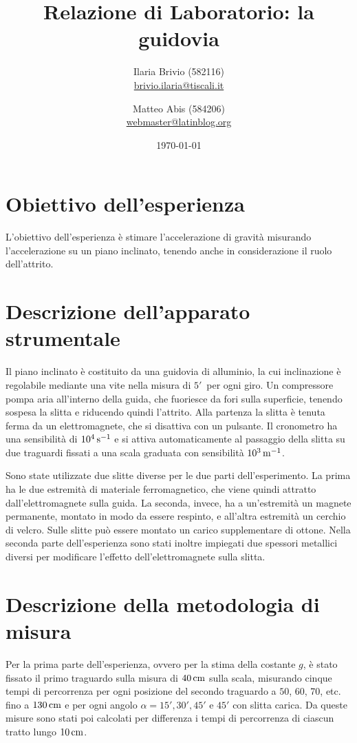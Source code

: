 \documentclass[italian,a4paper]{article}
\begin{document}
\title{Relazione di Laboratorio: la guidovia}
\author{\normalsize Ilaria Brivio (582116)\\%
\normalsize \url{brivio.ilaria@tiscali.it}%
\and %
\normalsize Matteo Abis (584206)\\ %
\normalsize \url{webmaster@latinblog.org}}
\date{\today}
\maketitle
\section{Obiettivo dell'esperienza}
L'obiettivo dell'esperienza è stimare l'accelerazione di gravità misurando l'accelerazione su un piano inclinato, tenendo anche in considerazione il ruolo dell'attrito.
\section{Descrizione dell'apparato strumentale}
Il piano inclinato è costituito da una guidovia di alluminio, la cui inclinazione è regolabile mediante una vite nella misura di $5'$~per ogni giro. Un compressore pompa aria all'interno della guida, che fuoriesce da fori sulla superficie, tenendo sospesa la slitta e riducendo quindi l'attrito. Alla partenza la slitta è tenuta ferma da un elettromagnete, che si disattiva con un pulsante. Il cronometro ha una sensibilità di $\unit[10^4]{s^{-1}}$ e si attiva automaticamente al passaggio della slitta su due traguardi fissati a una scala graduata con sensibilità $\unit[10^3]{m^{-1}}$.

Sono state utilizzate due slitte diverse per le due parti dell'esperimento. La prima ha le due estremità di materiale ferromagnetico, che viene quindi attratto dall'elettromagnete sulla guida. La seconda, invece, ha a un'estremità un magnete permanente, montato in modo da essere respinto, e all'altra estremità un cerchio di velcro. Sulle slitte può essere montato un carico supplementare di ottone. Nella seconda parte dell'esperienza sono stati inoltre impiegati due spessori metallici diversi per modificare l'effetto dell'elettromagnete sulla slitta.
\section{Descrizione della metodologia di misura}
Per la prima parte dell'esperienza, ovvero per la stima della costante $g$, è stato fissato il primo traguardo sulla misura di $\unit[40]{cm}$ sulla scala, misurando cinque tempi di percorrenza per ogni posizione del secondo traguardo a $50$, 60, 70, etc. fino a $\unit[130]{cm}$ e per ogni angolo $\alpha = 15', 30',45'$ e $45'$ con slitta carica. Da queste misure sono stati poi calcolati per differenza i tempi di percorrenza di ciascun tratto lungo $\unit[10]{cm}$.
\end{document}
